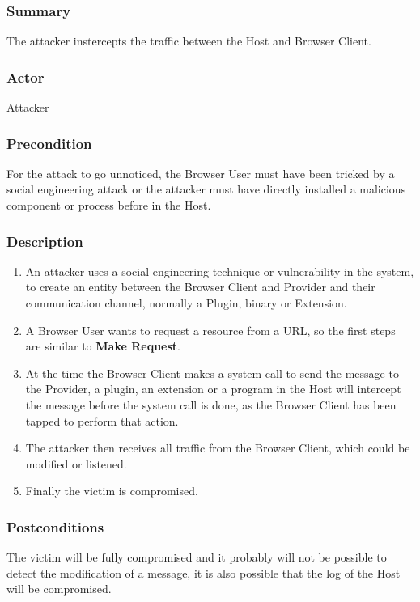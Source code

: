 \documentclass{sig-alternate-05-2015}
\begin{document}
  
  \subsubsection*{Summary} The attacker instercepts the traffic between the Host and Browser Client.
  \subsubsection*{Actor} Attacker
  \subsubsection*{Precondition} For the attack to go unnoticed, the Browser User must have been tricked by a social engineering attack or the attacker must have directly installed a malicious component or process before in the Host.

  \subsubsection*{Description}
      \begin{enumerate}
        \item An attacker uses a social engineering technique or vulnerability in the system, to create an entity between the Browser Client and Provider and their communication channel, normally a Plugin, binary or Extension.
        \item A Browser User wants to request a resource from a URL, so the first steps are similar to \textbf{Make Request}.
        \item At the time the Browser Client makes a system call to send the message to the Provider, a plugin, an extension or a program in the Host will intercept the message before the system call is done, as the Browser Client has been tapped to perform that action.
        \item The attacker then receives all traffic from the Browser Client, which could be modified or listened.
        \item Finally the victim is compromised.
      \end{enumerate}
  \subsubsection*{Postconditions} The victim will be fully compromised and it probably will not be possible to detect the modification of a message, it is also possible that the log of the Host will be compromised.
\end{document}
